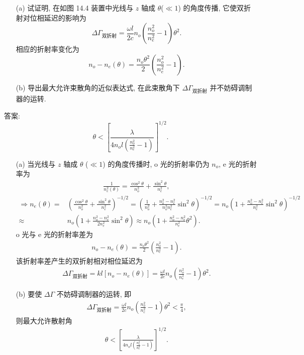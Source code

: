 \documentclass{note}
\begin{document}
\begin{exe}
    \begin{itemize}
        \item[(a)] 试证明, 在如图 14.4 装置中光线与 $z$ 轴成 $\theta$($\ll 1$) 的角度传播, 它使双折射对位相延迟的影响为
        \[
            \Delta\Gamma_{\text{双折射}}=\frac{\omega l}{2c}n_o\left(\frac{n_o^2}{n_e^2}-1\right)\theta^2.
        \]
        相应的折射率变化为
        \[
            n_o-n_e(\theta)=\frac{n_o\theta^2}{2}\left(\frac{n_o^2}{n_e^2}-1\right).
        \]
        \item[(b)] 导出最大允许束散角的近似表达式, 在此束散角下 $\Delta\Gamma_{\text{双折射}}$ 并不妨碍调制器的运转.
    \end{itemize}
    答案:
    \[
        \theta<\left[\frac{\lambda}{4n_ol\left(\frac{n_o^2}{n_e^2}-1\right)}\right]^{1/2}.
    \]
\end{exe}
\begin{sol}
    \begin{itemize}
        \item[(a)] 当光线与 $z$ 轴成 $\theta$ ($\ll 1$) 的角度传播时, o 光的折射率仍为 $n_o$, e 光的折射率为
        \begin{align}
            \frac{1}{n_e^2(\theta)}=\frac{\cos^2\theta}{n_o^2}+\frac{\sin^2\theta}{n_e^2},
        \end{align}
        \begin{align}
            \Longrightarrow n_e(\theta)=&\left(\frac{\cos^2\theta}{n_o^2}+\frac{\sin^2\theta}{n_e^2}\right)^{-1/2}=\left(\frac{1}{n_o^2}+\frac{n_o^2-n_e^2}{n_o^2n_e^2}\sin^2\theta\right)^{-1/2}=n_o\left(1+\frac{n_o^2-n_e^2}{n_e^2}\sin^2\theta\right)^{-1/2}\\
            \approx&n_o\left(1+\frac{n_o^2-n_e^2}{2n_e^2}\sin^2\theta\right)\approx n_o\left(1+\frac{n_o^2-n_e^2}{n_e^2}\theta^2\right).
        \end{align}
        o 光与 e 光的折射率差为
        \begin{align}
            n_o-n_e(\theta)=\frac{n_o\theta^2}{2}\left(\frac{n_o^2}{n_e^2}-1\right).
        \end{align}
        该折射率差产生的双折射相对相位延迟为
        \begin{align}
            \Delta\Gamma_{\text{双折射}}=kl[n_o-n_e(\theta)]=\frac{\omega l}{2c}n_o\left(\frac{n_o^2}{n_e^2}-1\right)\theta^2.
        \end{align}
        \item[(b)] 要使 $\Delta\Gamma$ 不妨碍调制器的运转, 即
        \begin{align}
            \Delta\Gamma_{\text{双折射}}=\frac{\omega l}{2c}n_o\left(\frac{n_o^2}{n_c^2}-1\right)\theta^2<\frac{\pi}{4},
        \end{align}
        则最大允许散射角
        \begin{align}
            \theta<\left[\frac{\lambda}{4n_ol\left(\frac{n_o^2}{n_e^2}-1\right)}\right]^{1/2}.
        \end{align}
    \end{itemize}
\end{sol}
\end{document}
